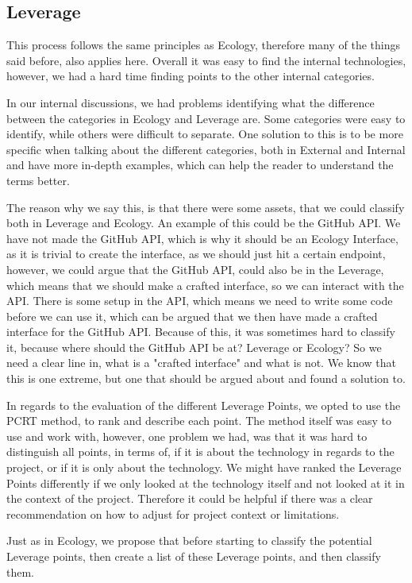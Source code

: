 \subsection{Leverage}
This process follows the same principles as Ecology, therefore many of the things said before, also applies here.
Overall it was easy to find the internal technologies, however, we had a hard time finding points to the other internal categories.

In our internal discussions, we had problems identifying what the difference between the categories in Ecology and Leverage are.
Some categories were easy to identify, while others were difficult to separate.
One solution to this is to be more specific when talking about the different categories, both in External and Internal and have more in-depth examples, which can help the reader to understand the terms better.

The reason why we say this, is that there were some assets, that we could classify both in Leverage and Ecology.
An example of this could be the GitHub API.
We have not made the GitHub API, which is why it should be an Ecology Interface, as it is trivial to create the interface, as we should just hit a certain endpoint, however, we could argue that the GitHub API, could also be in the Leverage, which means that we should make a crafted interface, so we can interact with the API.
There is some setup in the API, which means we need to write some code before we can use it, which can be argued that we then have made a crafted interface for the GitHub API.
Because of this, it was sometimes hard to classify it, because where should the GitHub API be at? 
Leverage or Ecology?
So we need a clear line in, what is a "crafted interface" and what is not.
We know that this is one extreme, but one that should be argued about and found a solution to.  

In regards to the evaluation of the different Leverage Points, we opted to use the PCRT method, to rank and describe each point.
The method itself was easy to use and work with, however, one problem we had, was that it was hard to distinguish all points, in terms of, if it is about the technology in regards to the project, or if it is only about the technology.
We might have ranked the Leverage Points differently if we only looked at the technology itself and not looked at it in the context of the project.
Therefore it could be helpful if there was a clear recommendation on how to adjust for project context or limitations.

Just as in Ecology, we propose that before starting to classify the potential Leverage points, then create a list of these Leverage points, and then classify them.

